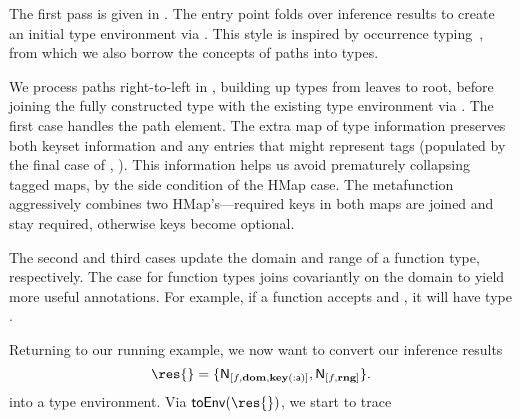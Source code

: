
The first pass is given in .
The entry point \generatetenv{} folds over inference results
to create an initial type environment via \inferupdateOp{}.
This style is inspired by occurrence typing~\cite{TF10},
from which we also borrow the concepts of paths into types.

We process paths right-to-left in \inferupdateOp{}, building
up types from leaves to root, before joining the fully constructed type with the existing
type environment via \joinOp{}.
The first case handles the \keypeOp{} path element.
The extra map of type information preserves both keyset
information and any entries that might represent tags
(populated by the final case of \trackEOp{}, ).
This information helps us avoid prematurely collapsing tagged maps,
by the side condition of the HMap \joinOp{} case.
The \joinHMapOp{} metafunction aggressively combines two HMap's---required
keys in both maps are joined and stay required, otherwise keys
become optional.

The second and third \inferupdateOp{} cases update the domain and range of a function type,
respectively.
The \joinOp{} case for function types joins covariantly on the domain to yield more useful
annotations. For example, if a function accepts \IntT{} and \Keyword{},
it will have type
\joinnoalign{\arrow{\IntT{}}{\UnknownT{}}}{\arrow{\Keyword{}}{\UnknownT{}}}
{\arrow{\Union{\IntT{}}{\Keyword{}}}{\UnknownT{}}}.

Returning to our running example, we now want to convert our inference results
$$
\res{} = \{\resentry{[f, \dompe{}, \inferkeypenokeyset{[\makekw{a}]}{\makekw{a}}]}{\IntT{}}, \resentry{[f, \rngpe{}]}{\IntT{}}\}.
$$
into a type environment. Via $\generatetenv{}(\res{})$, we start to trace


